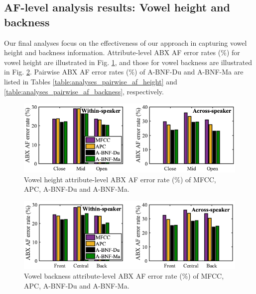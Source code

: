 \documentclass[transmag]{IEEEtran}
\begin{document}
\subsection{AF-level analysis results: Vowel height and backness}
Our final analyses focus on the effectiveness of our approach in capturing vowel height and backness information. Attribute-level ABX AF error rates ($\%$) for vowel height are illustrated in Fig. \ref{fig:analyses_per_af_vowel_height}, and those for vowel backness are illustrated in Fig. \ref{fig:analyses_per_af_vowel_backness}. Pairwise ABX AF error rates ($\%$) of A-BNF-Du and A-BNF-Ma are listed in Tables \ref{table:analyses_pairwise_af_height} and \ref{table:analyses_pairwise_af_backness}, respectively.
\begin{figure}[!t]
    \centering
    \includegraphics[width = \linewidth]{vowel_height_abx_adjust_journal.png}
    \caption{Vowel height attribute-level ABX AF error rate ($\%$) of MFCC, APC, A-BNF-Du and A-BNF-Ma.}
    \label{fig:analyses_per_af_vowel_height}
\end{figure}
\begin{figure}[!t]
    \centering
    \includegraphics[width = \linewidth]{vowel_backness_abx_adjust_journal.png}
    \caption{Vowel backness attribute-level ABX AF error rate ($\%$) of MFCC, APC, A-BNF-Du and A-BNF-Ma.}
    \label{fig:analyses_per_af_vowel_backness}
\end{figure}
\end{document}
